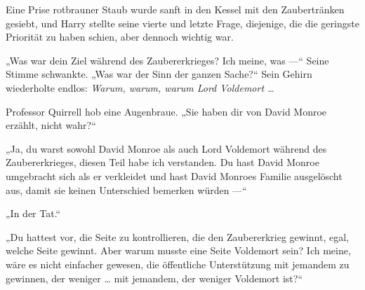 Eine Prise rotbrauner Staub wurde sanft in den Kessel mit den Zaubertränken gesiebt, und Harry stellte seine vierte und letzte Frage, diejenige, die die geringste Priorität zu haben schien, aber dennoch wichtig war.

„Was war dein Ziel während des Zaubererkrieges? Ich meine, was —“
Seine Stimme schwankte.
„Was war der Sinn der ganzen Sache?“
Sein Gehirn wiederholte endlos: \emph{Warum, warum, warum Lord Voldemort …}

Professor Quirrell hob eine Augenbraue.
„Sie haben dir von David Monroe erzählt, nicht wahr?“

„Ja, du warst sowohl David Monroe als auch Lord Voldemort während des Zaubererkrieges, diesen Teil habe ich verstanden. Du hast David Monroe umgebracht sich als er verkleidet und hast David Monroes Familie ausgelöscht aus, damit sie keinen Unterschied bemerken würden —“

„In der Tat.“

„Du hattest vor, die Seite zu kontrollieren, die den Zaubererkrieg gewinnt, egal, welche Seite gewinnt. Aber warum musste eine Seite Voldemort sein? Ich meine, wäre es nicht einfacher gewesen, die öffentliche Unterstützung mit jemandem zu gewinnen, der weniger … mit jemandem, der weniger Voldemort ist?“

